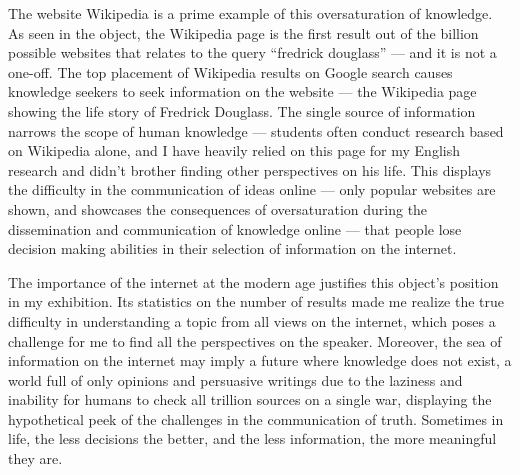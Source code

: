 \documentclass[a4paper,11pt]{article}
\begin{document}
The website Wikipedia is a prime example of this oversaturation of knowledge. As seen in the object, the Wikipedia page is the first result out of the billion possible websites that relates to the query ``fredrick douglass'' --- and it is not a one-off. The top placement of Wikipedia results on Google search causes knowledge seekers to seek information on the website --- the Wikipedia page showing the life story of Fredrick Douglass.
The single source of information narrows the scope of human knowledge --- students often conduct research based on Wikipedia alone, and I have heavily relied on this page for my English research and didn't brother finding other perspectives on his life. This displays the difficulty in the communication of ideas online --- only popular websites are shown, and showcases the consequences of oversaturation during the dissemination and communication of knowledge online --- that people lose decision making abilities in their selection of information on the internet.


The importance of the internet at the modern age justifies this object's position in my exhibition. Its statistics on the number of results made me realize the true difficulty in understanding a topic from all views on the internet, which poses a challenge for me to find all the perspectives on the speaker. Moreover, the sea of information on the internet may imply a future where knowledge does not exist, a world full of only opinions and persuasive writings due to the laziness and inability for humans to check all trillion sources on a single war, displaying the hypothetical peek of the challenges in the communication of truth. Sometimes in life, the less decisions the better, and the less information, the more meaningful they are.


\end{document}
